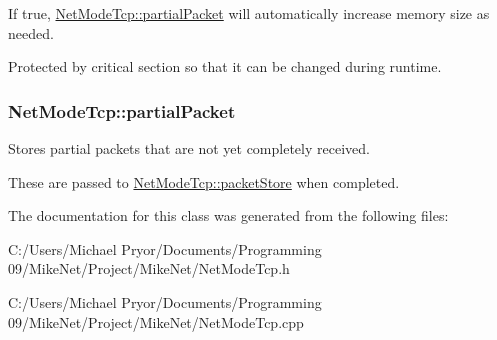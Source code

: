 If true, \hyperlink{class_net_mode_tcp_a1f20ef5cfc101a9e3a55bbbcbadaf899}{NetModeTcp::partialPacket} will automatically increase memory size as needed. 

Protected by critical section so that it can be changed during runtime. \hypertarget{class_net_mode_tcp_a1f20ef5cfc101a9e3a55bbbcbadaf899}{
\subsubsection[{partialPacket}]{ {\bf NetModeTcp::partialPacket}}}
\label{class_net_mode_tcp_a1f20ef5cfc101a9e3a55bbbcbadaf899}


Stores partial packets that are not yet completely received. 

These are passed to \hyperlink{class_net_mode_tcp_a0571ffe9a67f99a1c69af04b906e05b6}{NetModeTcp::packetStore} when completed. 

The documentation for this class was generated from the following files:\begin{DoxyCompactItemize}
\item 
C:/Users/Michael Pryor/Documents/Programming 09/MikeNet/Project/MikeNet/NetModeTcp.h\item 
C:/Users/Michael Pryor/Documents/Programming 09/MikeNet/Project/MikeNet/NetModeTcp.cpp\end{DoxyCompactItemize}
